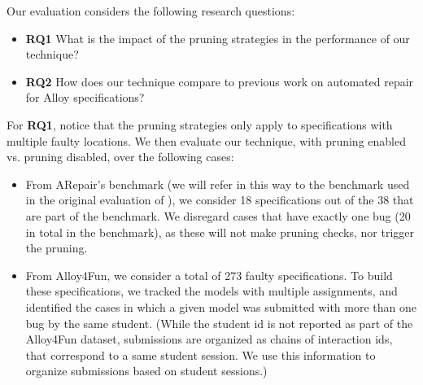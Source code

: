 Our evaluation considers the following research questions:
\begin{itemize}

    \item \textbf{RQ1} What is the impact of the pruning strategies in the performance of our technique?

    \item \textbf{RQ2} How does our technique compare to previous work on automated repair for Alloy specifications?

\end{itemize}
For \textbf{RQ1}, notice that the pruning strategies only apply to specifications with multiple faulty locations. We then evaluate our technique, with pruning enabled vs. pruning disabled, over the following cases:
\begin{itemize}

    \item From ARepair's benchmark (we will refer in this way to the benchmark used in the original evaluation of \cite{Wang+2018}), we consider 18 specifications out of the 38 that are part of the benchmark. We disregard cases that have exactly one bug (20 in total in the benchmark), as these will not make pruning checks, nor trigger the pruning. %

    \item From Alloy4Fun, we consider a total of 273 faulty specifications. To build these specifications, we tracked the models with multiple assignments, and identified the cases in which a given model was submitted with more than one bug by the same student. (While the student id is not reported as part of the Alloy4Fun dataset, submissions are organized as chains of interaction ids, that correspond to a same student session. We use this information to organize submissions based on student sessions.) 

\end{itemize}
